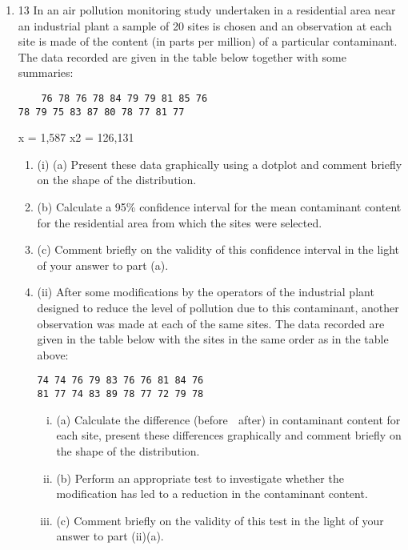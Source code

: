 \documentclass[a4paper,12pt]{article}
\begin{document}
\begin{enumerate}
\item
13 In an air pollution monitoring study undertaken in a residential area near an industrial
plant a sample of 20 sites is chosen and an observation at each site is made of the
content (in parts per million) of a particular contaminant. The data recorded are given
in the table below together with some summaries:
\begin{verbatim}
    76 78 76 78 84 79 79 81 85 76
78 79 75 83 87 80 78 77 81 77

\end{verbatim}

x = 1,587 
x2 = 126,131
\begin{enumerate}
    \item (i) (a) Present these data graphically using a dotplot and comment briefly on
the shape of the distribution.
    \item  (b) Calculate a 95\% confidence interval for the mean contaminant content
for the residential area from which the sites were selected.
    \item (c) Comment briefly on the validity of this confidence interval in the light
of your answer to part (a). 
    \item  (ii) After some modifications by the operators of the industrial plant designed to
reduce the level of pollution due to this contaminant, another observation was
made at each of the same sites. The data recorded are given in the table below
with the sites in the same order as in the table above:
\begin{verbatim}
74 74 76 79 83 76 76 81 84 76
81 77 74 83 89 78 77 72 79 78
\end{verbatim}
\begin{enumerate}[(i)]
    \item (a) Calculate the difference (before  after) in contaminant content for
each site, present these differences graphically and comment briefly on
the shape of the distribution.
    \item (b) Perform an appropriate test to investigate whether the modification has
led to a reduction in the contaminant content.
    \item (c) Comment briefly on the validity of this test in the light of your answer
to part (ii)(a). 

\end{enumerate}
\end{enumerate}


\newpage


\end{enumerate}
\end{document}
